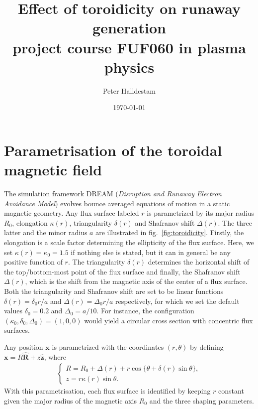 \documentclass[11pt,a4paper]{article}
\title{Effect of toroidicity on runaway generation\\\vspace{.3cm} \large{project course FUF060 in plasma physics}}
\author{Peter Halldestam}
\date{\today}
\renewcommand{\vec}[1]{\boldsymbol{#1}}
\begin{document}
\maketitle


\section{Parametrisation of the toroidal magnetic field}
The simulation framework \textsc{DREAM} (\textit{Disruption and Runaway Electron Avoidance Model}) evolves bounce averaged equations of motion in a static magnetic geometry.
Any flux surface labeled $r$ is parametrized by its major radius $R_0$, elongation $\kappa(r)$, triangularity $\delta(r)$ and Shafranov shift $\Delta(r)$.
The three latter and the minor radius $a$ are illustrated in fig.\ \ref{fig:toroidicity}.
Firstly, the elongation is a scale factor determining the ellipticity of the flux surface.
Here, we set $\kappa(r)=\kappa_0=1.5$ if nothing else is stated, but it can in general be any positive function of $r$.
The triangularity $\delta(r)$ determines the horizontal shift of the top/bottom-most point of the flux surface and finally, the Shafranov shift $\Delta(r)$, which is the shift from the magnetic axis of the center of a flux surface.
Both the triangularity and Shafranov shift are set to be linear functions $\delta(r)=\delta_0 r/a$ and $\Delta(r)=\Delta_0 r/a$ respectively, for which we set the default values $\delta_0=0.2$ and $\Delta_0=a/10$.
For instance, the configuration $(\kappa_0, \delta_0, \Delta_0)=(1, 0, 0)$ would yield a circular cross section with concentric flux surfaces.

Any position $\vec{x}$ is parametrized with the coordinates $(r, \theta)$ by defining $\vec{x}=R\vec{\hat{R}}+z\vec{\hat{z}}$, where
\begin{align}
    \label{eq:param}
    \begin{cases}
        R
        =R_0+\Delta(r)+r\cos\{\theta+\delta(r)\sin\theta\},\\
        z
        =r\kappa(r)\sin\theta.
    \end{cases}
\end{align}
With this parametrisation, each flux surface is identified by keeping $r$ constant given the major radius of the magnetic axis $R_0$ and the three shaping parameters.\\
\end{document}
